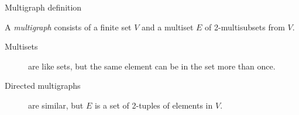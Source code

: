 \documentclass[dvipsnames, hidelinks]{beamer}
\begin{document}
  
  
  \begin{frame}{Multigraph definition}
    \begin{definition}
    A \emph{multigraph} consists of a finite set $V$ and a multiset $E$ of 2-multisubsets from $V$.
    \end{definition}
    \vspace{0.2cm}
    \begin{description}
      \item[Multisets] are like sets, but the same element can be in the set more than once.
      \item[Directed multigraphs] are similar, but $E$ is a set of 2-tuples of elements in $V$.
    \end{description}
  \end{frame}
  
\end{document}
